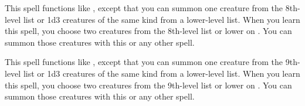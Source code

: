\begin{spelleffect}
    This spell functions like , except that you can summon one creature from the 8th-level list or 1d3 creatures of the same kind from a lower-level list. When you learn this spell, you choose two creatures from the 8th-level list or lower on . You can summon those creatures with this or any other  spell.
\end{spelleffect}

\begin{spelleffect}
    This spell functions like , except that you can summon one creature from the 9th-level list or 1d3 creatures of the same kind from a lower-level list. When you learn this spell, you choose two creatures from the 9th-level list or lower on . You can summon those creatures with this or any other  spell.
\end{spelleffect}

